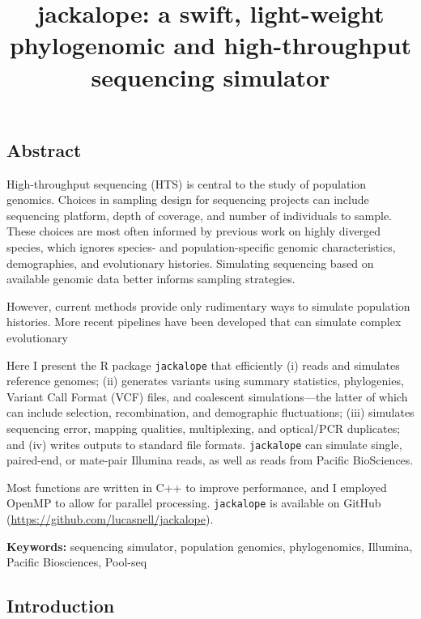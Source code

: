 \documentclass[12pt,]{article}
\title{jackalope: a swift, light-weight phylogenomic and high-throughput sequencing simulator}
\author{}
\date{}
\begin{document}
\maketitle

{
\hypersetup{linkcolor=black}
\setcounter{tocdepth}{2}
\tableofcontents
}
\hypertarget{abstract}{%
\subsection{Abstract}\label{abstract}}

High-throughput sequencing (HTS) is central to the study of population genomics.
Choices in sampling design for sequencing projects can include
sequencing platform, depth of coverage, and number of individuals to sample.
These choices are most often informed by previous work on highly diverged species,
which ignores species- and population-specific genomic characteristics, demographies,
and evolutionary histories.
Simulating sequencing based on available genomic data better informs sampling
strategies.

However, current methods provide only rudimentary ways to simulate population
histories.
More recent pipelines have been developed that can simulate complex evolutionary

Here I present the R package \texttt{jackalope} that efficiently
(i) reads and simulates reference genomes;
(ii) generates variants using summary statistics, phylogenies,
Variant Call Format (VCF) files, and coalescent simulations---the latter of which can
include selection, recombination, and demographic fluctuations;
(iii) simulates sequencing error, mapping qualities, multiplexing, and
optical/PCR duplicates;
and
(iv) writes outputs to standard file formats.
\texttt{jackalope} can simulate single, paired-end, or mate-pair Illumina reads,
as well as reads from Pacific BioSciences.

Most functions are written in C++ to improve performance, and I employed OpenMP to
allow for parallel processing.
\texttt{jackalope} is available on GitHub
(\url{https://github.com/lucasnell/jackalope}).

\textbf{Keywords:} sequencing simulator, population genomics, phylogenomics,
Illumina, Pacific Biosciences, Pool-seq

\hypertarget{introduction}{%
\subsection{Introduction}\label{introduction}}
\end{document}
